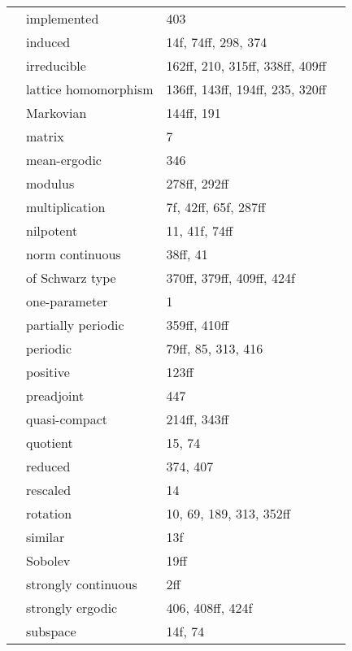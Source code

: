 \documentclass[10pt]{scrartcl}
\begin{document}
\begin{longtable}{>{\bfseries}p{4cm}p{4cm}p{4cm}p{4cm}}
	& implemented 	& 403 \\
	& induced 	& 14f, 74ff, 298, 374 \\
	& irreducible 	& 162ff, 210, 315ff, 338ff, 409ff \\
	& lattice homomorphism 	& 136ff, 143ff, 194ff, 235, 320ff \\
	& Markovian 	& 144ff, 191 \\
	& matrix 	& 7 \\
	& mean-ergodic 	& 346 \\
	& modulus 	& 278ff, 292ff \\
	& multiplication 	& 7f, 42ff, 65f, 287ff \\
	& nilpotent 	& 11, 41f, 74ff \\
	& norm continuous 	& 38ff, 41 \\
	& of Schwarz type 	& 370ff, 379ff, 409ff, 424f \\
	& one-parameter 	& 1 \\
	& partially periodic 	& 359ff, 410ff \\
	& periodic 	& 79ff, 85, 313, 416 \\
	& positive 	& 123ff \\
	& preadjoint 	& 447 \\
	& quasi-compact 	& 214ff, 343ff \\
	& quotient 	& 15, 74 \\
	& reduced 	& 374, 407 \\
	& rescaled 	& 14 \\
	& rotation 	& 10, 69, 189, 313, 352ff \\
	& similar 	& 13f \\
	& Sobolev 	& 19ff \\
	& strongly continuous 	& 2ff \\
	& strongly ergodic 	& 406, 408ff, 424f \\
	& subspace 	& 14f, 74 \\

\end{longtable}
\end{document}
